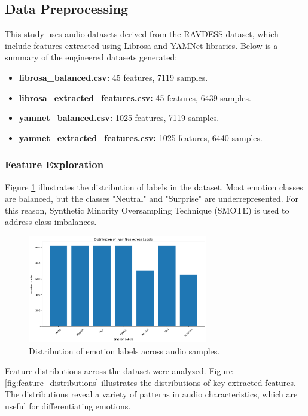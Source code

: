\documentclass{article}
\begin{document}
\subsection{Data Preprocessing}
This study uses audio datasets derived from the RAVDESS dataset, which include features extracted using Librosa 
and YAMNet libraries. Below is a summary of the engineered datasets generated:

\begin{itemize}
    \item \textbf{librosa\_balanced.csv:} 45 features, 7119 samples.
    \item \textbf{librosa\_extracted\_features.csv:} 45 features, 6439 samples.
    \item \textbf{yamnet\_balanced.csv:} 1025 features, 7119 samples.
    \item \textbf{yamnet\_extracted\_features.csv:} 1025 features, 6440 samples.
\end{itemize}

\subsubsection*{Feature Exploration}

Figure \ref{fig:label_distribution} illustrates the distribution of labels in the dataset. Most emotion classes 
are balanced, but the classes "Neutral" and "Surprise" are underrepresented. For this reason, Synthetic Minority 
Oversampling Technique (SMOTE) is used to address class imbalances.

\begin{figure}[!h]
    \centering
    \includegraphics[width=0.7\textwidth]{../assets/label_distribution.png}
    \caption{Distribution of emotion labels across audio samples.}
    \label{fig:label_distribution}
\end{figure}

Feature distributions across the dataset were analyzed. Figure \ref{fig:feature_distributions} illustrates the 
distributions of key extracted features. The distributions reveal a variety of patterns in audio characteristics, 
which are useful for differentiating emotions.
\end{document}
